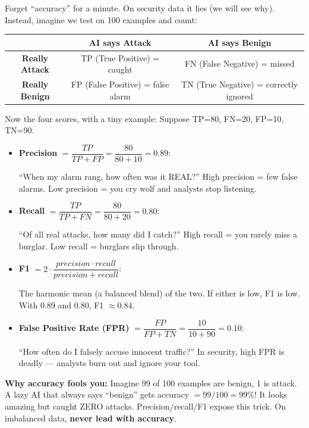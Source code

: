 \documentclass[11pt,a4paper]{article}
\begin{document}
Forget ``accuracy'' for a minute. On security data it lies (we will see why).
Instead, imagine we test on 100 examples and count:

\begin{center}
\small
\begin{tabular}{@{}c|cc@{}}
      & \textbf{AI says Attack} & \textbf{AI says Benign} \\
\midrule
\textbf{Really Attack} & TP (True Positive) = caught & FN (False Negative) = missed \\
\textbf{Really Benign} & FP (False Positive) = false alarm & TN (True Negative) = correctly ignored \\
\end{tabular}
\end{center}

Now the four scores, with a tiny example: Suppose TP=80, FN=20, FP=10, TN=90.

\begin{itemize}[leftmargin=1.6em,itemsep=2pt]
  \item \textbf{Precision} $= \dfrac{TP}{TP+FP} = \dfrac{80}{80+10}=0.89$:

        ``When my alarm rang, how often was it REAL?''
        High precision = few false alarms. Low precision = you cry wolf and
        analysts stop listening.

  \item \textbf{Recall} $= \dfrac{TP}{TP+FN} = \dfrac{80}{80+20}=0.80$:

        ``Of all real attacks, how many did I catch?''
        High recall = you rarely miss a burglar. Low recall = burglars slip
        through.

  \item \textbf{F1} $= 2\cdot\dfrac{precision\cdot recall}{precision+recall}$:

The harmonic mean (a balanced blend) of the two. If either is low, F1
is low. With 0.89 and 0.80, F1 $\approx 0.84$.

  \item \textbf{False Positive Rate (FPR)} $= \dfrac{FP}{FP+TN}
= \dfrac{10}{10+90}=0.10$:

        ``How often do I falsely accuse innocent traffic?'' In security, high
        FPR is deadly --- analysts burn out and ignore your tool.
\end{itemize}

\begin{warnbox}
\textbf{Why accuracy fools you:}
Imagine 99 of 100 examples are benign, 1 is attack. A lazy AI that always says
``benign'' gets accuracy $= 99/100 = 99\%$! It looks amazing but caught ZERO
attacks. Precision/recall/F1 expose this trick. On imbalanced data, \textbf{never
lead with accuracy}.
\end{warnbox}
\end{document}
